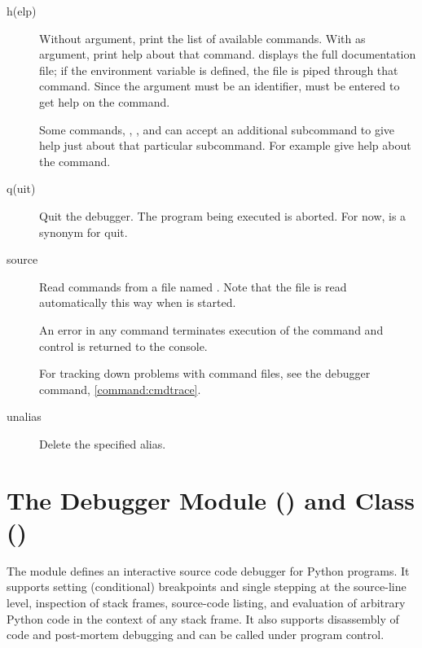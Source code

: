 \begin{description}
\item[h(elp) ]

Without argument, print the list of available commands.  With
 as argument, print help about that command.   displays the full documentation file; if the environment
variable  is defined, the file is piped through that
command.  Since the  argument must be an identifier,
 must be entered to get help on the \samp{!} command.

Some commands, , , and  can accept an
additional subcommand to give help just about that particular
subcommand. For example  give help about the
 command.

\item[q(uit)]\label{command:quit}

Quit the debugger. The program being executed is aborted. For now,
 is a synonym for quit.

\item[source ]\label{command:source}

Read commands from a file named .
Note that the file  is read automatically
this way when  is started.

An error in any command terminates execution of the command and
control is returned to the console.

For tracking down problems with command files, see the  debugger command, \ref{command:cmdtrace}. 

\item[unalias ]\label{command:unalias}

Delete the specified alias.

\end{description}

\section{The Debugger Module () and Class () \label{pydb-module-class}}

The module  defines an interactive source code
debugger for Python programs.  It supports setting
(conditional) breakpoints and single stepping at the source-line
level, inspection of stack frames, source-code listing, and evaluation
of arbitrary Python code in the context of any stack frame.  It also
supports disassembly of code and post-mortem debugging and can be
called under program control.

